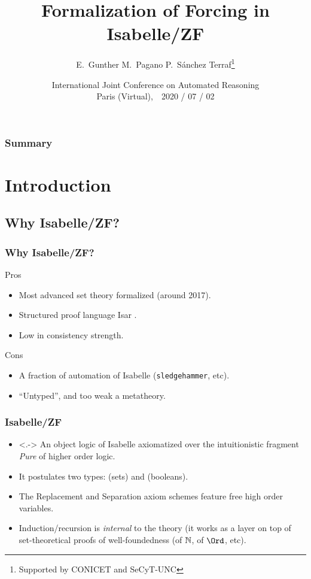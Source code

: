 \documentclass[english]{beamer}
\title[Forcing in Isabelle/ZF]{Formalization of Forcing in Isabelle/ZF}
\author[E.~Gunther, M.~Pagano, PST]{E.~Gunther \qquad M.~Pagano \qquad P.~Sánchez Terraf\thanks{Supported by
    CONICET and SeCyT-UNC} 
}
\institute[UNC]{CIEM-FaMAF --- Universidad Nacional de Córdoba}
\date[IJCAR 2020]{International Joint Conference on Automated
  Reasoning\\ Paris (Virtual),\ \  2020 / 07 / 02}
\begin{document}

\begin{frame}[plain]
  \titlepage
  \begin{center}
    \insertlogo
  \end{center}
\end{frame}
%
\begin{frame}
  \frametitle{Summary}
  \tableofcontents
  \transwipe
\end{frame}
%
\section{Introduction}

\subsection{Why Isabelle/ZF?}

\begin{frame}
  \frametitle{Why Isabelle/ZF?}
  \begin{block}{Pros}
    \begin{itemize}
    \item Most advanced set theory formalized (around 2017).
    \item Structured proof language Isar
      \citep{DBLP:conf/tphol/Wenzel99}.
    \item Low in consistency strength.
    \end{itemize}
  \end{block}
  \pause
  \begin{block}{Cons}
    \begin{itemize}
    \item A fraction of automation of Isabelle (\texttt{sledgehammer},
      etc).
    \item ``Untyped'', and too weak a metatheory.
    \end{itemize}
  \end{block}
\end{frame}

\begin{frame}
  \frametitle{Isabelle/ZF \citep{DBLP:journals/jar/PaulsonG96}}
  \begin{itemize}
  \item<.-> An object logic of Isabelle axiomatized over the
    intuitionistic fragment  \emph{Pure} of higher order logic.
  \item<+-> It postulates two types: 
    (sets) and  (booleans). 
  \item<+-> The Replacement and Separation axiom schemes feature free
    high order variables.
  \item<+-> Induction/recursion is \emph{internal} to the theory (it works as a
    layer on top of set-theoretical proofs of well-foundedness (of
    $\mathbb{N}$, of $\Ord$, etc).
  \end{itemize}
\end{frame}
\end{document}
